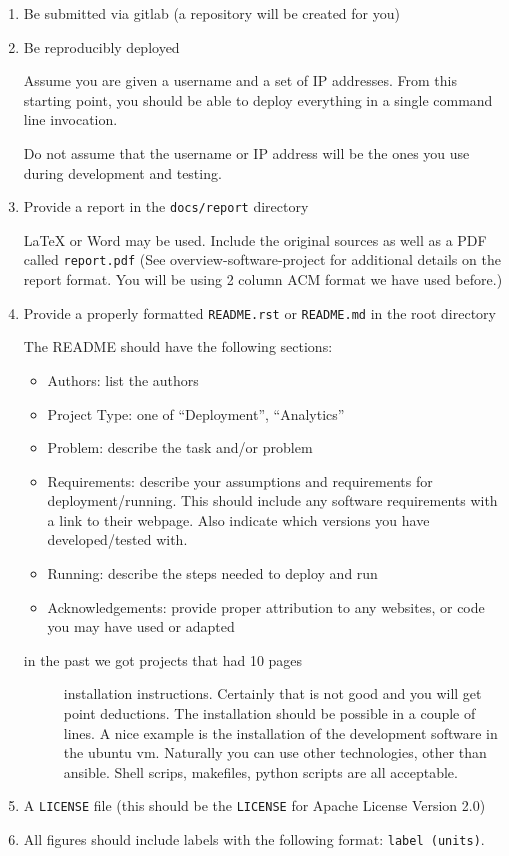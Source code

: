\begin{enumerate}
\item
  Be submitted via gitlab (a repository will be created for you)
\item
  Be reproducibly deployed

  Assume you are given a username and a set of IP addresses. From this
  starting point, you should be able to deploy everything in a single
  command line invocation.

  Do not assume that the username or IP address will be the ones you use
  during development and testing.
\item
  Provide a report in the \texttt{docs/report} directory

  LaTeX or Word may be used. Include the original sources as well as a
  PDF called \texttt{report.pdf} (See overview-software-project for
  additional details on the report format. You will be using 2 column
  ACM format we have used before.)
\item
  Provide a properly formatted \texttt{README.rst} or \texttt{README.md}
  in the root directory

  The README should have the following sections:

  \begin{itemize}

  \item
    Authors: list the authors
  \item
    Project Type: one of ``Deployment'', ``Analytics''
  \item
    Problem: describe the task and/or problem
  \item
    Requirements: describe your assumptions and requirements for
    deployment/running. This should include any software requirements
    with a link to their webpage. Also indicate which versions you have
    developed/tested with.
  \item
    Running: describe the steps needed to deploy and run
  \item
    Acknowledgements: provide proper attribution to any websites, or
    code you may have used or adapted
  \end{itemize}

  \begin{description}
  \item[in the past we got projects that had 10 pages]
  installation instructions. Certainly that is not good and you will get
  point deductions. The installation should be possible in a couple of
  lines. A nice example is the installation of the development software
  in the ubuntu vm. Naturally you can use other technologies, other than
  ansible. Shell scrips, makefiles, python scripts are all acceptable.
  \end{description}
\item
  A \texttt{LICENSE} file (this should be the \texttt{LICENSE} for
  Apache License Version 2.0)
\item
  All figures should include labels with the following format:
  \texttt{label\ (units)}.


\end{enumerate}
